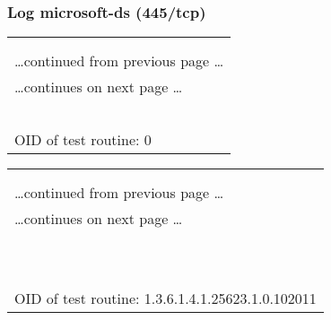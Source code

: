 \documentclass{article}
\begin{document}
\subsubsection{Log microsoft-ds (445/tcp)}
\label{port:192.168.248.131 microsoft-ds (445/tcp) Log}

\begin{longtable}{|p{}|}
\hline
\rowcolor{openvas_log}{\color{white}{Log}}\\
\rowcolor{openvas_log}{\color{white}{NVT: }}\\
\hline
\endfirsthead
\hfill\ldots continued from previous page \ldots \\
\hline
\endhead
\hline
\ldots continues on next page \ldots \\
\endfoot
\hline
\endlastfoot
\\
\rowcolor{white}{\verb=Open port.=}\\
\rowcolor{white}{\verb==}\\
\rowcolor{white}{\verb==}\\
\\
OID of test routine: 0\\
\end{longtable}

\begin{longtable}{|p{}|}
\hline
\rowcolor{openvas_log}{\color{white}{Log (CVSS: 0.0) }}\\
\rowcolor{openvas_log}{\color{white}{NVT: SMB NativeLanMan}}\\
\hline
\endfirsthead
\hfill\ldots continued from previous page \ldots \\
\hline
\endhead
\hline
\ldots continues on next page \ldots \\
\endfoot
\hline
\endlastfoot
\\
\rowcolor{white}{\verb= Summary:=}\\
\rowcolor{white}{\verb= It is possible to extract OS, domain and SMB server information=}\\
\rowcolor{white}{\verb=from the Session Setup AndX Response packet which is generated=}\\
\rowcolor{white}{\verb=during NTLM authentication.Detected SMB workgroup: WORKGROUP=}\\
\rowcolor{white}{\verb=Detected SMB server: Windows Vista (TM) Business 6.0=}\\
\rowcolor{white}{\verb=Detected OS: Windows Vista (TM) Business 6000=}\\
\rowcolor{white}{\verb==}\\
\rowcolor{white}{\verb==}\\
\\
OID of test routine: 1.3.6.1.4.1.25623.1.0.102011\\
\end{longtable}
\end{document}
